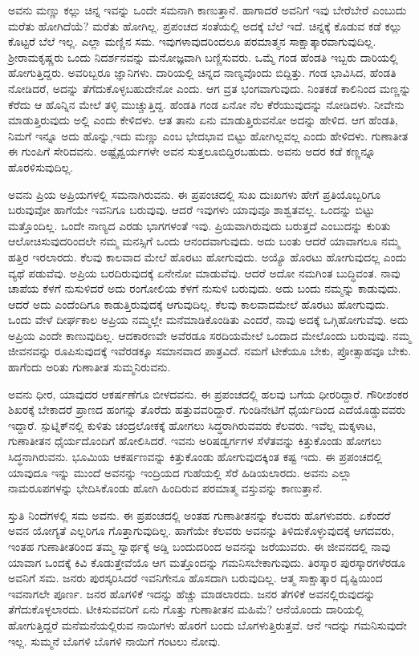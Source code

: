 ಅವನು ಮಣ್ಣು ಕಲ್ಲು ಚಿನ್ನ ಇವನ್ನು ಒಂದೇ ಸಮನಾಗಿ ಕಾಣುತ್ತಾನೆ. ಹಾಗಾದರೆ ಅವನಿಗೆ ಇವು ಬೇರೆಬೇರೆ ಎಂಬುದು ಮರೆತು ಹೋಗಿದೆಯೆ? ಮರೆತು ಹೋಗಿಲ್ಲ. ಪ್ರಪಂಚದ ಸಂತೆಯಲ್ಲಿ ಅದಕ್ಕೆ ಬೆಲೆ ಇದೆ. ಚಿನ್ನಕ್ಕೆ ಕೊಡುವ ಕಡೆ ಕಲ್ಲು ಕೊಟ್ಟರೆ ಬೆಲೆ ಇಲ್ಲ. ಎಲ್ಲಾ ಮಣ್ಣಿನ ಸಮ. ಇವುಗಳಾವುದರಿಂದಲೂ ಪರಮಾತ್ಮನ ಸಾಕ್ಷಾತ್ಕಾರವಾಗುವುದಿಲ್ಲ. ಶ‍್ರೀರಾಮಕೃಷ್ಣರು ಒಂದು ನಿದರ್ಶನವನ್ನು ಮನೋಜ್ಞವಾಗಿ ಬಣ್ಣಿಸುವರು. ಒಮ್ಮೆ ಗಂಡ ಹೆಂಡತಿ ಇಬ್ಬರು ದಾರಿಯಲ್ಲಿ ಹೋಗುತ್ತಿದ್ದರು. ಅವರಿಬ್ಬರೂ ಜ್ಞಾನಿಗಳು. ದಾರಿಯಲ್ಲಿ ಚಿನ್ನದ ನಾಣ್ಯವೊಂದು ಬಿದ್ದಿತ್ತು. ಗಂಡ ಭಾವಿಸಿದ, ಹೆಂಡತಿ ನೋಡಿದರೆ, ಅದನ್ನು ತೆಗೆದುಕೊಳ್ಳಬಹುದೇನೋ ಎಂದು. ಆಗ ವ್ರತ ಭಂಗವಾಗುವುದು. ನಿಂತಕಡೆ ಕಾಲಿನಿಂದ ಮಣ್ಣನ್ನು ಕೆರೆದು ಆ ಹೊನ್ನಿನ ಮೇಲೆ ತಳ್ಳಿ ಮುಚ್ಚುತ್ತಿದ್ದ. ಹೆಂಡತಿ ಗಂಡ ಏನೋ ನೆಲ ಕೆರೆಯುವುದನ್ನು ನೋಡಿದಳು. ನೀವೇನು ಮಾಡುತ್ತಿರುವುದು ಅಲ್ಲಿ ಎಂದು ಕೇಳಿದಳು. ಆತ ತಾನು ಏನು ಮಾಡುತ್ತಿರುವನೋ ಅದನ್ನು ಹೇಳಿದ. ಆಗ ಹೆಂಡತಿ, ನಿಮಗೆ ಇನ್ನೂ ಅದು ಹೊನ್ನು,ಇದು ಮಣ್ಣು ಎಂಬ ಭೇದಭಾವ ಬಿಟ್ಟು ಹೋಗಿಲ್ಲವಲ್ಲ ಎಂದು ಹೇಳಿದಳು. ಗುಣಾತೀತ ಈ ಗುಂಪಿಗೆ ಸೇರಿದವನು. ಅಷ್ಟೈಶ್ವರ್ಯಗಳೇ ಅವನ ಸುತ್ತಲೂ\break ಬಿದ್ದಿರಬಹುದು. ಅವನು ಅದರ ಕಡೆ ಕಣ್ಣನ್ನೂ ಹೊರಳಿಸುವುದಿಲ್ಲ.

ಅವನು ಪ್ರಿಯ ಅಪ್ರಿಯಗಳಲ್ಲಿ ಸಮನಾಗಿರುವನು. ಈ ಪ್ರಪಂಚದಲ್ಲಿ ಸುಖ ದುಃಖಗಳು ಹೇಗೆ ಪ್ರತಿಯೊಬ್ಬರಿಗೂ ಬರುವುವೋ ಹಾಗೆಯೇ ಇವನಿಗೂ ಬರುವುವು. ಆದರೆ ಇವುಗಳು ಯಾವುವೂ ಶಾಶ್ವತವಲ್ಲ. ಒಂದನ್ನು ಬಿಟ್ಟು ಮತ್ತೊಂದಿಲ್ಲ. ಒಂದೇ ನಾಣ್ಯದ ಎರಡು ಭಾಗ\-ಗಳಂತೆ ಇವು. ಪ್ರಿಯವಾಗಿರುವುದು ಬರುತ್ತದೆ ಎಂಬುದನ್ನು ಕುರಿತು ಆಲೋಚಿಸುವುದರಿಂದಲೇ ನಮ್ಮ ಮನಸ್ಸಿಗೆ ಒಂದು ಆನಂದವಾಗುವುದು. ಅದು ಬಂತು ಆದರೆ ಯಾವಾಗಲೂ ನಮ್ಮ ಹತ್ತಿರ ಇರಲಾರದು. ಕೆಲವು ಕಾಲವಾದ ಮೇಲೆ ಹೊರಟು ಹೋಗುವುದು. ಅಯ್ಯೊ ಹೊರಟು ಹೋಗುವುದಲ್ಲ ಎಂದು ವ್ಯಥೆ ಪಡುವೆವು. ಅಪ್ರಿಯ ಬರದಿರುವುದಕ್ಕೆ ಏನೇನೋ ಮಾಡುವೆವು. ಆದರೆ ಅದೋ ನಮಗಿಂತ ಬುದ್ಧಿವಂತ. ನಾವು ಚಾಪೆಯ ಕೆಳಗೆ ನುಸುಳಿದರೆ ಅದು ರಂಗೋಲಿಯ ಕೆಳಗೆ ನುಸುಳಿ ಬರುವುದು. ಅದು ಬಂದು ನಮ್ಮನ್ನು ಕಾಡುವುದು. ಆದರೆ ಅದು ಎಂದೆಂದಿಗೂ ಕಾಡುತ್ತಿರುವುದಕ್ಕೆ ಆಗುವುದಿಲ್ಲ. ಕೆಲವು ಕಾಲವಾದಮೇಲೆ ಹೊರಟು ಹೋಗುವುದು. ಒಂದು ವೇಳೆ ದೀರ್ಘಕಾಲ ಅಪ್ರಿಯ ನಮ್ಮಲ್ಲೇ ಮನೆಮಾಡಿಕೊಂಡಿತು ಎಂದರೆ, ನಾವು ಅದಕ್ಕೆ ಒಗ್ಗಿಹೋಗು\-ವೆವು. ಅದು ಅಪ್ರಿಯ ಎಂದೇ ಕಾಣುವುದಿಲ್ಲ. ಆದಕಾರಣವೇ ಅವೆರಡೂ ಸರದಿಯಮೇಲೆ ಒಂದಾದ ಮೇಲೊಂದು ಬರುವುವು. ನಮ್ಮ ಜೀವನವನ್ನು ರೂಪಿಸುವುದಕ್ಕೆ ಇವೆರಡಕ್ಕೂ ಸಮಾನವಾದ ಪಾತ್ರವಿದೆ. ನಮಗೆ ಟೀಕೆಯೂ ಬೇಕು, ಪ್ರೋತ್ಸಾಹವೂ ಬೇಕು. ಹಾಗೆಂದು ಅರಿತು ಗುಣಾತೀತ ಸುಮ್ಮನಿರುವನು.

ಅವನು ಧೀರ, ಯಾವುದರ ಆಕರ್ಷಣೆಗೂ ಬೀಳದವನು. ಈ ಪ್ರಪಂಚದಲ್ಲಿ ಹಲವು ಬಗೆಯ ಧೀರರಿದ್ದಾರೆ. ಗೌರೀಶಂಕರ ಶಿಖರಕ್ಕೆ ಬೇಕಾದರೆ ಪ್ರಾಣದ ಹಂಗನ್ನು ತೊರೆದು ಹತ್ತುವವರಿದ್ದಾರೆ. ಗುಂಡಿನೇಟಿಗೆ ಧೈರ್ಯದಿಂದ ಎದೆಯೊಡ್ಡುವವರು ಇದ್ದಾರೆ. ಸ್ಪುಟ್ನಿಕ್​ನಲ್ಲಿ ಕುಳಿತು ಚಂದ್ರಲೋಕಕ್ಕೆ ಹೋಗಲು ಸಿದ್ಧರಾಗಿರುವವರು ಕೆಲವರು. ಇವೆಲ್ಲ ಮಕ್ಕಳಾಟ, ಗುಣಾತೀತನ ಧೈರ್ಯದೊಂದಿಗೆ ಹೋಲಿಸಿದರೆ. ಇವನು ಅರಿಷಡ್ವರ್ಗಗಳ ಸೆಳೆತವನ್ನು ಕಿತ್ತುಕೊಂಡು ಹೋಗಲು ಸಿದ್ಧನಾಗಿರುವನು. ಭೂಮಿಯ ಆಕರ್ಷಣವನ್ನು ಕಿತ್ತುಕೊಂಡು ಹೋಗುವುದಕ್ಕಿಂತ ಕಷ್ಟ ಇದು. ಈ ಪ್ರಪಂಚದಲ್ಲಿ ಯಾವುದೂ ಇನ್ನು ಮುಂದೆ ಅವನನ್ನು ಇಂದ್ರಿಯದ ಗುಹೆಯಲ್ಲಿ ಸೆರೆ ಹಿಡಿಯಲಾರದು. ಅವನು ಎಲ್ಲಾ ನಾಮರೂಪಗಳನ್ನು ಭೇದಿಸಿಕೊಂಡು ಹೋಗಿ ಹಿಂದಿರುವ ಪರಮಾತ್ಮ ವಸ್ತುವನ್ನು ಕಾಣುತ್ತಾನೆ.

ಸ್ತುತಿ ನಿಂದೆಗಳಲ್ಲಿ ಸಮ ಅವನು. ಈ ಪ್ರಪಂಚದಲ್ಲಿ ಅಂತಹ ಗುಣಾತೀತನನ್ನು ಕೆಲವರು ಹೊಗಳುವರು. ಏಕೆಂದರೆ ಅವನ ಯೋಗ್ಯತೆ ಎಲ್ಲರಿಗೂ ಗೊತ್ತಾಗುವುದಿಲ್ಲ. ಹಾಗೆಯೇ ಕೆಲವರು ಅವನನ್ನು ತಿಳಿದುಕೊಳ್ಳುವುದಕ್ಕೆ ಆಗದವರು, ಇಂತಹ ಗುಣಾತೀತರಿಂದ ತಮ್ಮ ಸ್ವಾರ್ಥಕ್ಕೆ ಅಡ್ಡಿ ಬಂದುದರಿಂದ ಅವನನ್ನು ಜರೆಯುವರು. ಈ ಜೀವನದಲ್ಲಿ ನಾವು ಯಾವಾಗ ಒಂದಕ್ಕೆ ಕಿವಿ ಕೊಡುತ್ತೇವೆಯೊ ಆಗ ಮತ್ತೊಂದನ್ನು ಗಮನಿಸಬೇಕಾಗುವುದು. ತಿರಸ್ಕಾರ ಪುರಸ್ಕಾರಗಳೆರಡೂ ಅವನಿಗೆ ಸಮ. ಜನರು ಪುರಸ್ಕರಿಸಿದರೆ ಇವನಿಗೇನೂ ಹೊಸದಾಗಿ ಬರುವುದಿಲ್ಲ. ಆತ್ಮ ಸಾಕ್ಷಾತ್ಕಾರ ದೃಷ್ಟಿಯಿಂದ ಇವನಾಗಲೇ ಪೂರ್ಣ. ಜನರ ಹೊಗಳಿಕೆ ಇದನ್ನು ಹೆಚ್ಚು ಮಾಡಲಾರದು. ಜನರ ತೆಗಳಿಕೆ ಅವನಲ್ಲಿರುವುದನ್ನು ತೆಗೆದುಕೊಳ್ಳಲಾರದು. ಟೀಕಿಸುವವರಿಗೆ ಏನು ಗೊತ್ತು ಗುಣಾತೀತನ ಮಹಿಮೆ? ಆನೆಯೊಂದು ದಾರಿಯಲ್ಲಿ ಹೋಗುತ್ತಿದ್ದರೆ ಮನೆಮನೆಯಲ್ಲಿರುವ ನಾಯಿಗಳು ಹೊರಗೆ ಬಂದು ಬೊಗಳುತ್ತಿರುತ್ತವೆ. ಆನೆ ಇದನ್ನು ಗಮನಿಸುವುದೇ ಇಲ್ಲ. ಸುಮ್ಮನೆ ಬೊಗಳಿ ಬೊಗಳಿ ನಾಯಿಗೆ ಗಂಟಲು ನೋವು.

